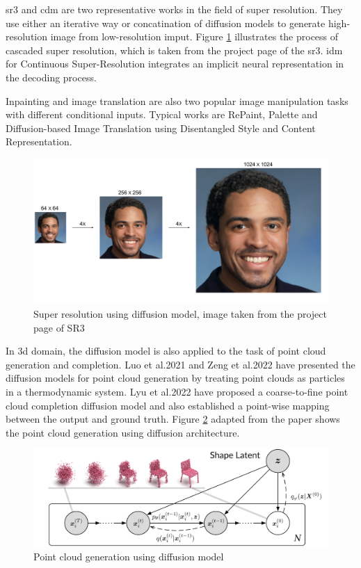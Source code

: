 \documentclass[12pt,DIV14,BCOR12mm,a4paper,footinclude=false,headinclude,parskip=half-,twoside,openright,cleardoublepage=empty,toc=index,bibliography=totoc,listof=totoc]{scrreprt}
\numberwithin{equation}{chapter}
\begin{document}
\gls{sr3}\cite{saharia2021image} and \gls{cdm}\cite{ho2021cascaded} are two representative works in the field of super resolution. They use either an iterative way or concatination of diffusion models to generate high-resolution image from low-resolution imput. Figure \ref{img:sr3} illustrates the process of cascaded super resolution, which is taken from the project page of the \gls{sr3}. \gls{idm} for Continuous Super-Resolution\cite{gao2023implicit} integrates an implicit neural representation in the decoding process.

Inpainting and image translation are also two popular image manipulation tasks with different conditional inputs. Typical works are RePaint\cite{lugmayr2022repaint}, Palette\cite{saharia2022palette} and Diffusion-based Image Translation using Disentangled Style and Content Representation\cite{kwon2023diffusionbased}.
\begin{figure}[h]
	\centering
	\includegraphics[scale=.08]{img/cascade_fig.png}
	\caption{Super resolution using diffusion model, image taken from the project page of SR3\cite{saharia2021image}}
	\label{img:sr3}
\end{figure}


In \gls{3d} domain, the diffusion model is also applied to the task of point cloud generation and completion. Luo et al.2021\cite{luo2021diffusion} and Zeng et al.2022\cite{zeng2022lion} have presented the diffusion models for point cloud generation by treating point clouds as particles in a thermodynamic system. Lyu et al.2022\cite{lyu2022conditional} have proposed a coarse-to-fine point cloud completion diffusion model and also established a point-wise mapping between the output and ground truth. Figure \ref{img:pcd} adapted from the paper shows the point cloud generation using diffusion architecture.

\begin{figure}[h]
	\centering
	\includegraphics[scale=1.8]{img/teaser.png}
	\caption{Point cloud generation using diffusion model}
	\label{img:pcd}
\end{figure}
\end{document}
